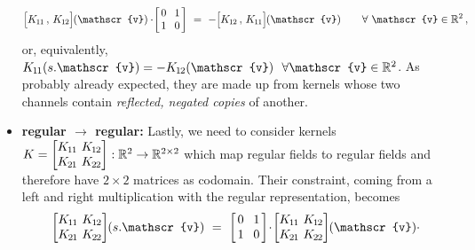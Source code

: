 \begin{itemize}
\begin{align}
                \pig[\Koo \,,\, \Kot\pig] \mkern-1mu (\mathscr{v})
                \cdot\!
                \begin{bmatrix} \hspace{1.5pt} 0 &\mkern-4mu 1 \hspace*{1.5pt} \\ \hspace{1.5pt} 1 &\mkern-4mu 0 \hspace*{1.5pt} \end{bmatrix}
            \ =\ 
                - \pig[\Kot \,,\, \Koo\pig] \mkern-1mu (\mathscr{v})
            \qquad \forall\ \mathscr{v} \in \R^2 \,,
        \end{align}
        or, equivalently, $\Koo(s.\mathscr{v}) = -\Kot(\mathscr{v})\ \ \forall \mathscr{v} \in \R^2$.
        As probably already expected, they are made up from kernels whose two channels contain \emph{reflected, negated copies} of another.
    \item[{\rule[2.0pt]{2pt}{2pt}}]
    \textbf{regular $\bm\to$ regular:}
        Lastly, we need to consider kernels
        $K = \begin{bmatrix} K_{\mkern-1mu 1 \mkern-1mu 1} &\mkern-12mu K_{\mkern-1mu 1 \mkern-1mu 2} \\ K_{\mkern-1mu 2 \mkern-1mu 1} &\mkern-12mu K_{\mkern-1mu 2 \mkern-1mu 2} \end{bmatrix}: \mathbb{R}^2 \to \mathbb{R}^{2\times2}$
        which map regular fields to regular fields and therefore have $2\times2$ matrices as codomain.
        Their constraint, coming from a left and right multiplication with the regular representation, becomes
        \begin{align}
                \begin{bmatrix} \Koo &\mkern-12mu \Kot \\ \Kto &\mkern-12mu \Ktt \end{bmatrix} \mkern-4mu (s.\mathscr{v})
            \ =\ 
                \begin{bmatrix} \hspace{1.5pt} 0 &\mkern-4mu 1 \hspace*{1.5pt} \\ \hspace{1.5pt} 1 &\mkern-4mu 0 \hspace*{1.5pt} \end{bmatrix}
                \!\cdot\!
                \begin{bmatrix} \Koo &\mkern-12mu \Kot \\ \Kto &\mkern-12mu \Ktt \end{bmatrix} \mkern-4mu (\mathscr{v})
                \cdot\!

\end{align}
\end{itemize}
